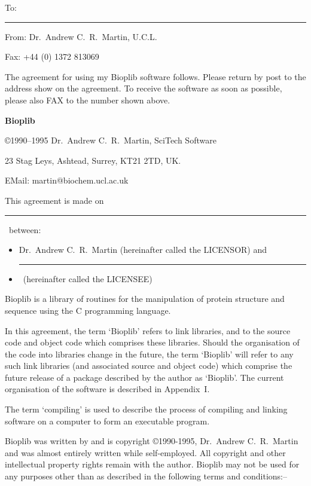 \documentclass[12pt]{article}
\newcommand{\licensee}{\rule{5.3in}{0.5pt}\mbox{}}
\renewcommand{\date}{\rule{1.5in}{0.5pt}\mbox{}}
\begin{document}
\thispagestyle{empty}
{\sffamily\Large
\noindent To: \licensee

\noindent From: Dr.\ Andrew C.\ R.\ Martin, U.C.L.

\noindent Fax: +44 (0) 1372 813069
\vspace{1in}


The agreement for using my Bioplib software follows. Please return by
post to the address show on the agreement. To receive the software as
soon as possible, please also FAX to the number shown above.
}


\newpage
\setcounter{page}{1}

\begin{center}
{\large\bfseries Bioplib}

\copyright 1990--1995 Dr.\ Andrew C.\ R.\ Martin, SciTech Software

23 Stag Leys, Ashtead, Surrey, KT21 2TD, UK.

EMail: martin@biochem.ucl.ac.uk

\end{center}
\vspace{1em}

This agreement is made on \date\ between:
\begin{itemize}
\item Dr.\ Andrew C.\ R.\ Martin (hereinafter called the LICENSOR) and
\item \licensee\ (hereinafter called the LICENSEE)
\end{itemize}

Bioplib is a library of routines for the manipulation of protein
structure and sequence using the C programming language. 

In this agreement, the term `Bioplib' refers to link libraries, and to
the source code and object code which comprises these
libraries. Should the organisation of the code into libraries change
in the future, the term `Bioplib' will refer to any such link
libraries (and associated source and object code) which comprise the
future release of a package described by the author as `Bioplib'.
The current organisation of the software is described in Appendix~I.

The term `compiling' is used to describe the process of compiling and
linking software on a computer to form an executable program.

Bioplib was written by and is copyright \copyright 1990-1995, 
Dr.\ Andrew C.\ R.\ Martin and was almost entirely written while 
self-employed. All copyright and other intellectual property rights 
remain with the author. Bioplib may not be used for any purposes other 
than as described in the following terms and conditions:--
\end{document}
